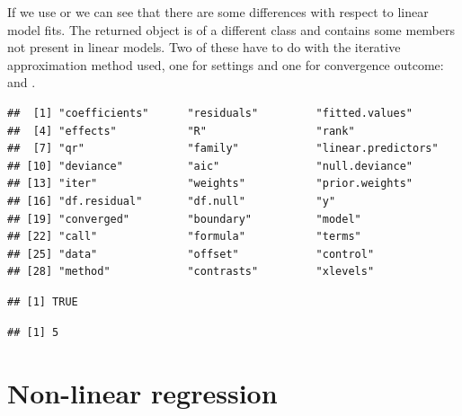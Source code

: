 \documentclass[krantz2]{krantz}\usepackage{knitr}%
\begin{document}
\begin{explainbox}
If we use  or  we can see that there are some differences with respect to linear model fits. The returned object is of a different class and contains some members not present in linear models. Two of these have to do with the iterative approximation method used, one for settings and one for convergence outcome:  and .

\begin{knitrout}\footnotesize
{}\color{fgcolor}\begin{kframe}
\begin{alltt}
\end{alltt}
\begin{verbatim}
##  [1] "coefficients"      "residuals"         "fitted.values"    
##  [4] "effects"           "R"                 "rank"             
##  [7] "qr"                "family"            "linear.predictors"
## [10] "deviance"          "aic"               "null.deviance"    
## [13] "iter"              "weights"           "prior.weights"    
## [16] "df.residual"       "df.null"           "y"                
## [19] "converged"         "boundary"          "model"            
## [22] "call"              "formula"           "terms"            
## [25] "data"              "offset"            "control"          
## [28] "method"            "contrasts"         "xlevels"
\end{verbatim}
\begin{alltt}
\hlopt{$}
\end{alltt}
\begin{verbatim}
## [1] TRUE
\end{verbatim}
\begin{alltt}
\hlopt{$}
\end{alltt}
\begin{verbatim}
## [1] 5
\end{verbatim}
\end{kframe}
\end{knitrout}
\end{explainbox}


\section{Non-linear regression}\label{sec:stat:NLS}
%
%
\end{document}
